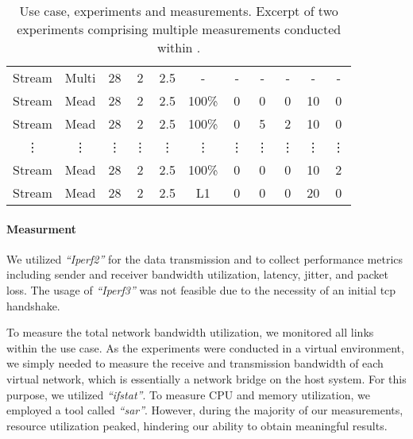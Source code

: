 \begin{table}
\begin{tabular}{@{}ccccccccccc@{}}
Stream   & Multi    & 28        & 2         & 2.5    & -      & -      & -         & -         & -               & -          \\
Stream   & Mead     & 28        & 2         & 2.5    & 100\%  & 0      & 0         & 0         & 10              & 0          \\
Stream   & Mead     & 28        & 2         & 2.5    & 100\%  & 0      & 5         & 2         & 10              & 0          \\
\vdots   & \vdots   & \vdots    & \vdots    & \vdots & \vdots & \vdots & \vdots    & \vdots    & \vdots          & \vdots \\[3pt]
Stream   & Mead     & 28        & 2         & 2.5    & 100\%  & 0      & 0         & 0         & 10              & 2          \\
Stream   & Mead     & 28        & 2         & 2.5    & L1     & 0      & 0         & 0         & 20              & 0          \\
\bottomrule
\end{tabular}
\caption[Use case, experiments and measurements]{
    Use case, experiments and measurements.
    Excerpt of two experiments comprising multiple measurements conducted
    within \nuci{}.
}
\label{tab:usecase_experiment_measurement}
\end{table}

\paragraph{Measurment} %
\label{par:Measurment}

We utilized \textit{``Iperf2''} for the data transmission and to collect
    performance metrics including sender and receiver bandwidth utilization,
    latency, jitter, and packet loss.
The usage of \textit{``Iperf3''} was not feasible due to the necessity of an
    initial \gls{tcp} handshake.

To measure the total network bandwidth utilization, we monitored all links
    within the use case.
As the experiments were conducted in a virtual environment, we simply needed to
    measure the receive and transmission bandwidth of each virtual network,
    which is essentially a network bridge on the host system.
For this purpose, we utilized \textit{``ifstat''}.
To measure CPU and memory utilization, we employed a tool called \textit{``sar''}.
However, during the majority of our measurements, resource utilization peaked,
    hindering our ability to obtain meaningful results.


